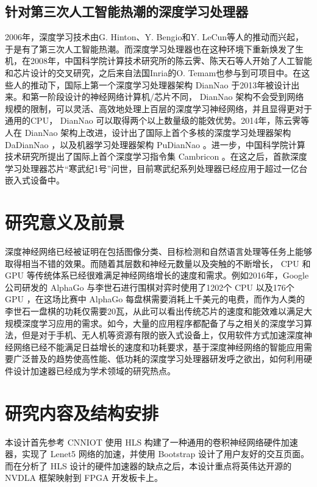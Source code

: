 \subsection{针对第三次人工智能热潮的深度学习处理器}
2006年，深度学习技术由G. Hinton、Y. Bengio和Y. LeCun等人的推动而兴起，于是有了第三次人工智能热潮。而深度学习处理器也在这种环境下重新焕发了生机，在2008年，中国科学院计算技术研究所的陈云霁、陈天石等人开始了人工智能和芯片设计的交叉研究，之后来自法国Inria的O. Temam也参与到可项目中。在这些人的推动下，国际上第一个深度学习处理器架构 DianNao 于2013年被设计出来。和第一阶段设计的神经网络计算机/芯片不同， DianNao 架构不会受到网络规模的限制，可以灵活、高效地处理上百层的深度学习神经网络，并且显得更对于通用的CPU， DianNao\cite{10.1145/2654822.2541967} 可以取得两个以上数量级的能效优势。2014年，陈云霁等人在 DianNao 架构上改进，设计出了国际上首个多核的深度学习处理器架构 DaDianNao\cite{7011421} ，以及机器学习处理器架构 PuDianNao \cite{10.1145/2786763.2694358} 。进一步，中国科学院计算技术研究所提出了国际上首个深度学习指令集 Cambricon\cite{7551409} 。在这之后，首款深度学习处理器芯片“寒武纪1号”问世，目前寒武纪系列处理器已经应用于超过一亿台嵌入式设备中。

\section{研究意义及前景}

深度神经网络已经被证明在包括图像分类、目标检测和自然语言处理等任务上能够取得相当不错的效果。而随着其层数和神经元数量以及突触的不断增长， CPU 和 GPU 等传统体系已经很难满足神经网络增长的速度和需求。例如2016年，Google公司研发的 AlphaGo 与李世石进行围棋对弈时使用了1202个 CPU 以及176个 GPU ，在这场比赛中 AlphaGo 每盘棋需要消耗上千美元的电费，而作为人类的李世石一盘棋的功耗仅需要20瓦，从此可以看出传统芯片的速度和能效难以满足大规模深度学习应用的需求。如今，大量的应用程序都配备了与之相关的深度学习算法，但是对于手机、无人机等资源有限的嵌入式设备上，仅用软件方式加速深度神经网络已经不能满足日益增长的速度和功耗要求，基于深度神经网络的智能应用需要广泛普及的趋势使高性能、低功耗的深度学习处理器研发呼之欲出，如何利用硬件设计加速器已经成为学术领域的研究热点。

\section{研究内容及结构安排}

本设计首先参考 CNNIOT 使用 HLS 构建了一种通用的卷积神经网络硬件加速器，实现了 Lenet5 网络的加速，并使用 Bootstrap 设计了用户友好的交互页面。而在分析了 HLS 设计的硬件加速器的缺点之后，本设计重点将英伟达开源的 NVDLA 框架映射到 FPGA 开发板卡上。


